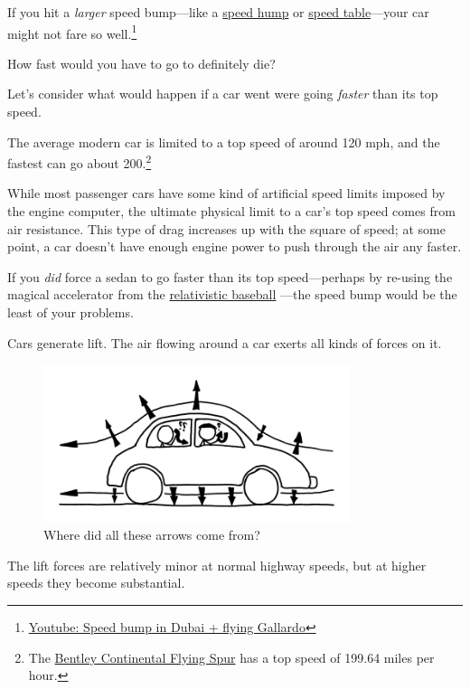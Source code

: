 {{If you hit a \emph{larger} speed bump—like a \href{https://en.wikipedia.org/wiki/Speed\_hump}{speed hump} or \href{https://en.wikipedia.org/wiki/Speed\_table}{speed table}—your car might not fare so well.{\footnote{ \href{http://www.youtube.com/watch?v=Vg79\_mM2CNY} {Youtube: Speed bump in Dubai + flying Gallardo}} } }

{How fast would you have to go to definitely die?}

{Let's consider what would happen if a car went were going \emph{faster} than its top speed.}

{The average modern car is limited to a top speed of around 120 mph, and the fastest can go about 200.{\footnote{The \href{http://fastestlaps.com/articles/which\_car\_is\_really\_the\_worlds\_fastest\_sedan.html}{Bentley Continental Flying Spur} has a top speed of 199.64 miles per hour.} } }

{While most passenger cars have some kind of artificial speed limits imposed by the engine computer, the ultimate physical limit to a car's top speed comes from air resistance. This type of drag increases up with the square of speed; at some point, a car doesn't have enough engine power to push through the air any faster.}

{If you \emph{did} force a sedan to go faster than its top speed—perhaps by re-using the magical accelerator from the \href{http://what-if.xkcd.com/1/}{relativistic baseball} —the speed bump would be the least of your problems.}

{Cars generate lift. The air flowing around a car exerts all kinds of forces on it.}

\begin{figure}[!htbp]
\centering
\includegraphics[scale=0.5, max width=0.8\textwidth]{imgs/a/61/speedbump_forces.png}
\caption{Where did all these arrows come from?}
\end{figure}

{The lift forces are relatively minor at normal highway speeds, but at higher speeds they become substantial.}

}
